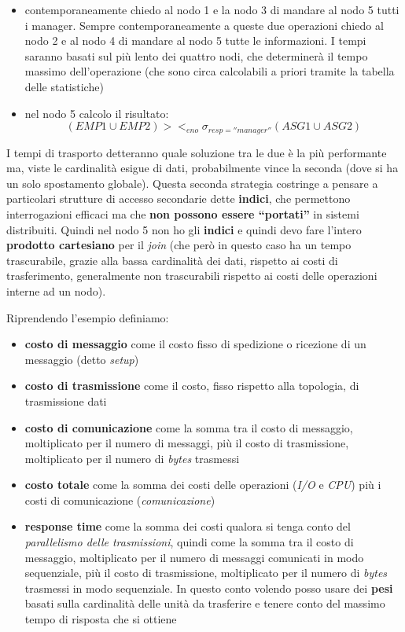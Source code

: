 \documentclass[a4paper,12pt, oneside]{book}
\begin{document}
\begin{esempio}
\begin{itemize}
    \item contemporaneamente chiedo al nodo 1 e la nodo 3 di mandare al nodo 5
    tutti i manager. Sempre contemporaneamente a queste due operazioni chiedo al
    nodo 2 e al nodo 4 di mandare al nodo 5 tutte le informazioni. I tempi
    saranno basati sul più lento dei quattro nodi, che determinerà il tempo
    massimo dell'operazione (che sono circa calcolabili a priori tramite la
    tabella delle statistiche)
    \item nel nodo 5 calcolo il risultato:
    \[(EMP1\cup EMP2)><_{eno}\sigma_{resp=''manager''}(ASG1\cup ASG2)\]
  \end{itemize}
  I tempi di trasporto detteranno quale soluzione tra le due è la più
  performante ma, viste le cardinalità esigue di dati, probabilmente vince la
  seconda (dove si ha un solo spostamento globale). Questa seconda strategia
  costringe a pensare a particolari strutture di accesso secondarie dette
  \textbf{indici}, che permettono interrogazioni efficaci ma che \textbf{non
    possono essere ``portati''} in sistemi distribuiti. Quindi nel nodo 5 non ho
  gli \textbf{indici} e quindi devo fare l'intero \textbf{prodotto cartesiano}
  per il \textit{join} (che però in questo caso ha un tempo trascurabile,
  grazie alla bassa cardinalità dei dati, rispetto ai costi di trasferimento,
  generalmente non trascurabili rispetto ai costi delle operazioni interne ad un
  nodo).
\end{esempio}
Riprendendo l'esempio definiamo:
\begin{itemize}
  \item \textbf{costo di messaggio} come il costo fisso di spedizione o
  ricezione di un messaggio (detto \textit{setup})
  \item \textbf{costo di trasmissione} come il costo, fisso rispetto alla
  topologia, di trasmissione dati
  \item \textbf{costo di comunicazione} come la somma tra il costo di messaggio,
  moltiplicato per il numero di messaggi, più il costo di trasmissione,
  moltiplicato per il numero di \textit{bytes} trasmessi
  \item \textbf{costo totale} come la somma dei costi delle operazioni
  (\textit{I/O} e \textit{CPU}) più i costi di comunicazione
  (\textit{comunicazione})
  \item \textbf{response time} come la somma dei costi qualora si tenga conto
  del \textit{parallelismo delle trasmissioni}, quindi come la somma tra il
  costo di messaggio, moltiplicato per il numero di messaggi comunicati in modo
  sequenziale, più il costo di trasmissione, moltiplicato per il numero di
  \textit{bytes} trasmessi in modo sequenziale. In questo conto volendo posso
  usare dei \textbf{pesi} basati sulla cardinalità delle unità da trasferire e
  tenere conto del massimo tempo di risposta che si ottiene
\end{itemize}
\end{document}
